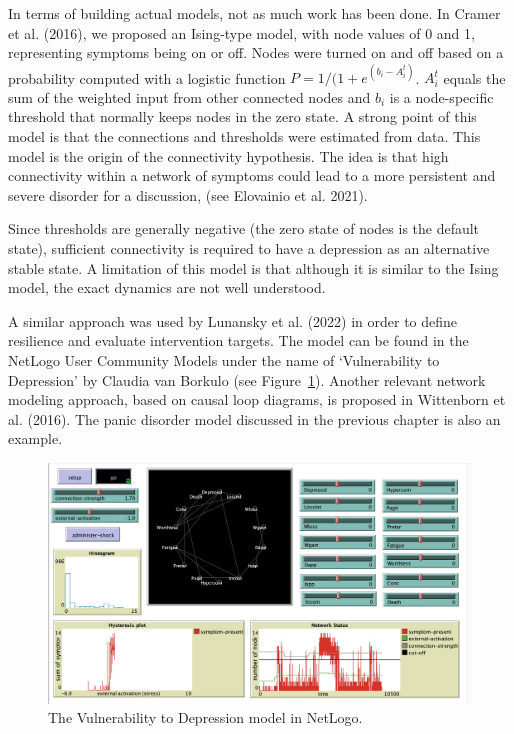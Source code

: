 \documentclass[
  letterpaper,
]{scrbook}
\begin{document}
In terms of building actual models, not as much work has been done. In
Cramer et al. (2016), we proposed an Ising-type model, with node values
of 0 and 1, representing symptoms being on or off. Nodes were turned on
and off based on a probability computed with a logistic function
\(P = 1/(1 + e^{(b_{i} - A_{i}^{t})}\). \(A_{i}^{t}\) equals the sum of
the weighted input from other connected nodes and \(b_{i}\) is a
node-specific threshold that normally keeps nodes in the zero state. A
strong point of this model is that the connections and thresholds were
estimated from data. This model is the origin of the connectivity
hypothesis. The idea is that high connectivity within a network of
symptoms could lead to a more persistent and severe disorder for a
discussion, (see Elovainio et al. 2021).

Since thresholds are generally negative (the zero state of nodes is the
default state), sufficient connectivity is required to have a depression
as an alternative stable state. A limitation of this model is that
although it is similar to the Ising model, the exact dynamics are not
well understood.

A similar approach was used by Lunansky et al. (2022) in order to define
resilience and evaluate intervention targets. The model can be found in
the NetLogo User Community Models under the name of `Vulnerability to
Depression' by Claudia van Borkulo (see
Figure~\ref{fig-ch6-img9-old-78}). Another relevant network modeling
approach, based on causal loop diagrams, is proposed in Wittenborn et
al. (2016). The panic disorder model discussed in the previous chapter
is also an example.

\begin{figure}

{\centering \includegraphics[width=5.77471in,height=\textheight]{media/ch6/image9.jpg}

}

\caption{\label{fig-ch6-img9-old-78}The Vulnerability to Depression
model in NetLogo.}

\end{figure}
\end{document}

